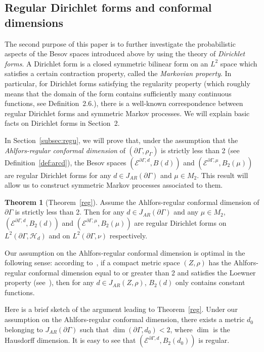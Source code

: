 \documentclass[10pt]{amsart}
\newtheorem{theo}{Theorem}[section]
\theoremstyle{definition}\newtheorem{defi}[theo]{Definition}\newtheorem{rema}[theo]{Remark}\newtheorem{exam}[theo]{Example}\newtheorem{exem}[theo]{Example}\newtheorem{nota}[theo]{Notation}
\newcommand{\ce}{\mathcal{E}}
\newcommand{\ch}{\mathcal{H}}
\newtheorem{innercustomthm}{Theorem}
\begin{document}
\subsection*{Regular Dirichlet forms and conformal dimensions}

The second purpose of this paper is to further investigate the probabilistic aspects of the Besov spaces introduced above by using the theory of \emph{Dirichlet forms}. A Dirichlet form is a closed symmetric bilinear form on an $L^2$ space which satisfies a certain contraction property, called the \emph{Markovian property}. In particular, for Dirichlet forms satisfying the regularity property (which roughly means that the domain of the form contains sufficiently many continuous functions, see Definition~2.6.), there is a well-known correspondence between regular Dirichlet forms and symmetric Markov processes. We will explain basic facts on Dirichlet forms in Section~2.

In Section~\ref{subsec:regu}, we will prove that, under the assumption that the \emph{Ahlfors-regular conformal dimension} of $(\partial\Gamma,\rho_{\Gamma})$ is strictly less than 2 (see Definition~\ref{def:arcd}), the Besov spaces $(\ce^{\partial\Gamma,d},B(d))$ and $(\ce^{\partial\Gamma,\mu},B_2(\mu))$ are regular Dirichlet forms for any $d\in J_{AR}(\partial\Gamma)$ and $\mu\in M_2$. This result will allow us to construct symmetric Markov processes associated to them.

\begin{innercustomthm}[{Theorem~\ref{reg}}]
Assume the Ahlfors-regular conformal dimension of $\partial\Gamma$ is strictly less than 2. Then for any $d\in J_{AR}(\partial\Gamma)$ and any $\mu\in M_2$, $(\ce^{\partial\Gamma,d},B_2(d))$ and $(\ce^{\partial\Gamma,\mu},B_2(\mu))$ are regular Dirichlet forms on $L^2(\partial\Gamma,\ch_{d})$ and on $L^2(\partial\Gamma,\nu)$ respectively.
\end{innercustomthm}
Our assumption on the Ahlfors-regular conformal dimension is optimal in the following sense: according to~\cite[Theorem~0.3]{BP}, if a compact metric space $(Z,\rho)$ has the Ahlfors-regular conformal dimension equal to or greater than 2 and satisfies the Loewner property (see~\cite[Chapter~8]{Hei}), then for any $d\in J_{AR}(Z,\rho)$, $B_2(d)$ only contains constant functions.

Here is a brief sketch of the argument leading to Theorem~\ref{reg}. Under our assumption on the Ahlfors-regular conformal dimension, there exists a metric $d_0$ belonging to $J_{AR}(\partial\Gamma)$ such that $\dim(\partial\Gamma,d_{0})<2$, where $\dim$ is the Hausdorff dimension. It is easy to see that $(\ce^{\partial\Gamma,d},B_2(d_0))$ is regular.
\end{document}
